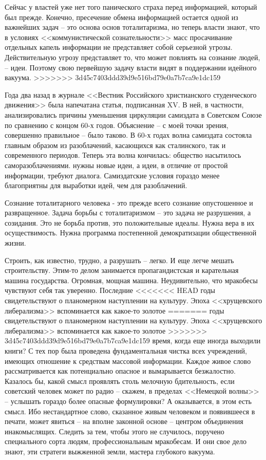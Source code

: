 \documentclass{book}
\begin{document}
Сейчас у властей уже нет того панического страха перед информацией, который был прежде. Конечно, пресечение обме­на информацией остается одной из важнейших задач -- это основа основ тоталитаризма, но теперь власти знают, что в условиях <<коммунистической сознательности>> масс просачивание отдельных капель информации не представляет собой серьезной угрозы. Действительную угрозу представляет то, что может повлиять на сознание людей, -- идеи. Поэтому свою первейшую задачу власти видят в поддержании идейного вакуума.
>>>>>>> 3d45c7403ddd39d9e516bd79e0a7b7ca9e1dc159

Года два назад в журнале <<Вестник Российского христианского студенческого движения>> была напечатана статья, подписанная XV. В ней, в частности, анализировались причины уменьшения циркуляции самиздата в Советском Союзе по сравнению с концом 60-х годов. Объяснение -- с моей точки зрения, совершенно правильное -- было таково. В 60-х годах волна самиздата состояла главным образом из разоблачений,  касающихся как сталинского, так и современного периодов. Теперь эта волна кончилась: общество насытилось саморазоблачениями. нужны новые идеи, а идеи, в отличие от простой информации, требуют диалога. Самиздатские условия гораздо менее благоприятны для выработки идей, чем для разоблачений.

Сознание тоталитарного человека - это прежде всего сознание опустошенное и развращенное. Задача борьбы с тоталитаризмом -- это задача не разрушения, а созидания. Это не борьба против,  это положительные идеалы. Нужна вера в их осуществимость. Нужна программа постепенной демократизации общественной жизни.

Строить, как известно, трудно, а разрушать -- легко. И еще легче мешать строительству. Этим-то делом занимается пропагандистская 
и карательная машина государства. Огромная, мощная машина. Неудивительно, что мракобесы чувствуют себя так уверенно. Последние 
<<<<<<< HEAD
годы свидетельствуют о планомерном наступлении на культуру. Эпоха <<хрущевского либе­рализма>> вспоминается как какое‑то золотое 
=======
годы свидетельствуют о планомерном наступлении на культуру. Эпоха <<хрущевского либе­рализма>> вспоминается как какое-то золотое 
>>>>>>> 3d45c7403ddd39d9e516bd79e0a7b7ca9e1dc159
время, когда еще иногда выходили книги?  С тех пор была проведена фундаментальная чистка всех учреждений, имеющих отношение к 
средствам массовой информации. Каждое живое слово рассматривается как потенциально опасное и вымарывается безжалостно. Казалось 
бы, какой смысл проявлять столь мелочную бдительность, если советский человек может по радио -- скажем, в пределах <<Немецкой 
волны>> -- услышать гораздо более опасные формулировки? А оказывается, в этом есть смысл. Ибо нестандартное слово, сказанное 
живым человеком и появившееся в печати, может явиться -- на вполне законной основе -- центром объединения инакомыслящих. Следить 
за тем, чтобы этого не случилось, поручено специального сорта людям, профессиональным мракобесам. И они свое дело знают, эти 
стратеги выжженной земли, мастера глубокого вакуума.
\end{document}
